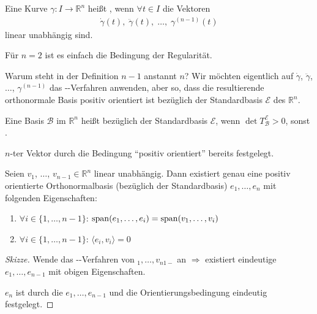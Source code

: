 \begin{definition}
	Eine Kurve $\gamma\!:I\to\mathbb{R}^n$ heißt , wenn $\forall t\in I$ die Vektoren \begin{align}
		\dot{\gamma}(t),\;\ddot{\gamma}(t), \;\dotsc, \; \gamma^{(n-1)}(t)
	\end{align}
	linear unabhängig sind.
\end{definition}

\begin{underlinedenvironment}[Bemerkung]
	Für $n=2$ ist es einfach die Bedingung der Regularität.
\end{underlinedenvironment}

Warum steht in der Definition $n-1$ anstannt $n$? Wir möchten eigentlich auf $\dot{\gamma}$, $\ddot{\gamma}$, $\dotsc$, $\gamma^{(n-1)}$ das --Verfahren anwenden, aber so, dass die resultierende orthonormale Basis positiv orientiert ist bezüglich der Standardbasis $\mathcal{E}$ des $\mathbb{R}^n$.

\begin{repetition}
	\begin{*definition}
		Eine Basis $\mathcal{B}$ im $\mathbb{R}^n$ heißt  bezüglich der Standardbasis $\mathcal{E}$, wenn $\det T_{\mathcal{B}}^{\mathcal{E}} > 0$, sonst .
	\end{*definition}
	\begin{underlinedenvironment}[$n=2$]
		$n$-ter Vektor durch die Bedingung "`positiv orientiert"' bereits festgelegt.
	\end{underlinedenvironment}
\end{repetition}

\begin{conclusion}
	Seien $v_1$, $\dotsc$, $v_{n-1}\in\mathbb{R}^n$ linear unabhängig. Dann existiert genau eine positiv orientierte Orthonormalbasis (bezüglich der Standardbasis) $e_1, \dotsc, e_n$ mit folgenden Eigenschaften:\begin{enumerate}[label={\arabic*)}]
		\item $\forall i\in\{1,\dotsc, n-1\}$: $\operatorname{span} (e_1,\dotsc,e_i) = \operatorname{span}(v_1,\dotsc,v_i)$
		\item $\forall i\in \{1,\dotsc,n-1\}$: $\langle e_i,v_i\rangle = 0$
	\end{enumerate}
\end{conclusion}
\begin{proof}[Skizze]
	Wende das --Verfahren von $_1,\dotsc,v_{n1-}$ an $\Rightarrow$ existiert eindeutige $e_1,\dotsc,e_{n-1}$ mit obigen Eigenschaften.
	
	$e_n$ ist durch die $e_1,\dotsc,e_{n-1}$ und die Orientierungsbedingung eindeutig festgelegt.
\end{proof}

